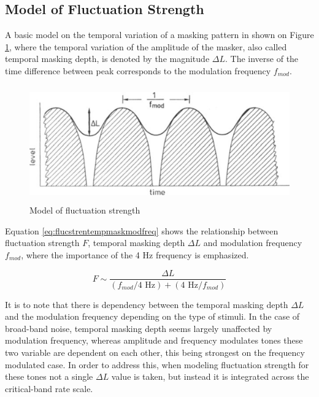 \subsection{Model of Fluctuation Strength}

A basic model on the temporal variation of a masking pattern in shown on Figure
\ref{fig:flucstrenmodel}, where the temporal variation of the amplitude of the
masker, also called temporal masking depth, is denoted by the magnitude
$\Delta L$. The inverse of the time difference between peak corresponds to the
modulation frequency $f_{mod}$.

\begin{figure}
    \centering
    \includegraphics[height=5cm]
        {img/FluctuationStrengthModel}
    \caption{Model of fluctuation strength
        \cite[pp. 254]{Fastl2007Psychoacoustics}}
    \label{fig:flucstrenmodel}
\end{figure}

Equation \ref{eq:flucstrentempmaskmodfreq} shows the relationship between
fluctuation strength $F$, temporal masking depth $\Delta L$ and modulation
frequency $f_{mod}$, where the importance of the 4 Hz frequency is emphasized.

\begin{equation}
    F \sim \frac{\Delta L}{(f_{mod}/4\text{ Hz}) + (4\text{ Hz}/f_{mod})}
    \label{eq:flucstrentempmaskmodfreq}
\end{equation}

It is to note that there is dependency between the temporal masking depth
$\Delta L$ and the modulation frequency depending on the type of stimuli. In the
case of broad-band noise, temporal masking depth seems largely unaffected by
modulation frequency, whereas amplitude and frequency modulates tones these two
variable are dependent on each other, this being strongest on the frequency
modulated case. In order to address this, when modeling fluctuation strength
for these tones not a single $\Delta L$ value is taken, but instead it is
integrated across the critical-band rate scale.

